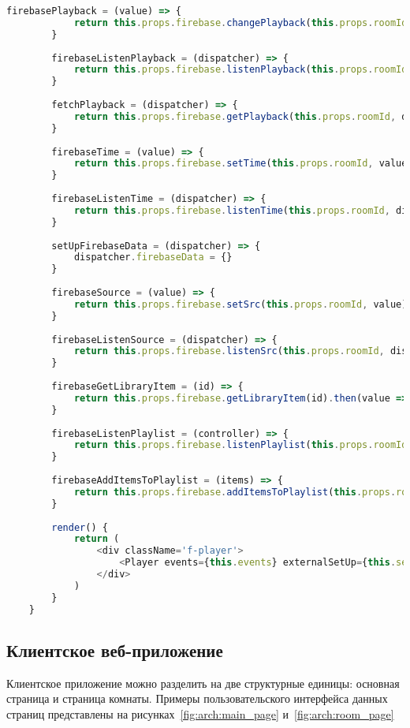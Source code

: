 \begin{lstlisting}[language=JavaScript,label={lst:fplayer},caption={Компонент FirebasePlayer}]
        firebasePlayback = (value) => {
            return this.props.firebase.changePlayback(this.props.roomId, !value)
        }
    
        firebaseListenPlayback = (dispatcher) => {
            return this.props.firebase.listenPlayback(this.props.roomId, dispatcher);
        }
    
        fetchPlayback = (dispatcher) => {
            return this.props.firebase.getPlayback(this.props.roomId, dispatcher);
        }
    
        firebaseTime = (value) => {
            return this.props.firebase.setTime(this.props.roomId, value)
        }
    
        firebaseListenTime = (dispatcher) => {
            return this.props.firebase.listenTime(this.props.roomId, dispatcher);
        }
    
        setUpFirebaseData = (dispatcher) => {
            dispatcher.firebaseData = {}
        }
    
        firebaseSource = (value) => {
            return this.props.firebase.setSrc(this.props.roomId, value);
        }
    
        firebaseListenSource = (dispatcher) => {
            return this.props.firebase.listenSrc(this.props.roomId, dispatcher);
        }
    
        firebaseGetLibraryItem = (id) => {
            return this.props.firebase.getLibraryItem(id).then(value => value)
        }
    
        firebaseListenPlaylist = (controller) => {
            return this.props.firebase.listenPlaylist(this.props.roomId, controller)
        }
    
        firebaseAddItemsToPlaylist = (items) => {
            return this.props.firebase.addItemsToPlaylist(this.props.roomId, items)
        }
    
        render() {
            return (
                <div className='f-player'>
                    <Player events={this.events} externalSetUp={this.setUp} libraryLogic={this.libraryLogic} playlistLogic={this.playlistLogic} />
                </div>
            )
        }
    }
\end{lstlisting}
    

\subsection{Клиентское веб-приложение}
Клиентское приложение можно разделить на две структурные единицы: основная страница и страница комнаты. Примеры пользовательского интерфейса данных страниц представлены на рисунках~\ref{fig:arch:main_page} и~\ref{fig:arch:room_page}
 
